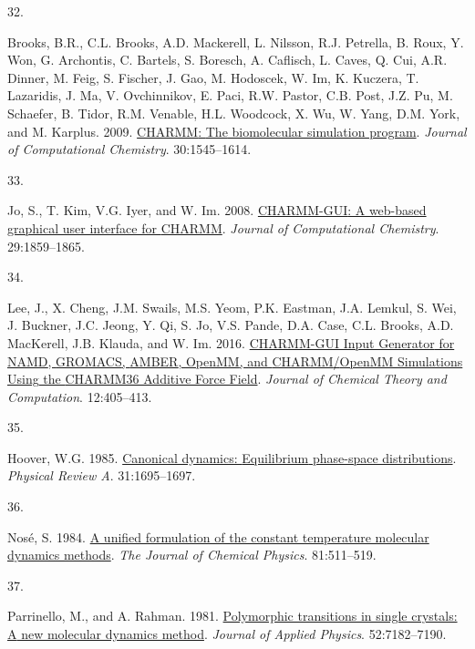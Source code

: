 \documentclass[
  twocolumn]{biophys-new-mod}
\newlength{\cslhangindent}
\newlength{\csllabelwidth}
\newlength{\cslentryspacingunit} %
\newenvironment{CSLReferences}[2] %
 {%
  \setlength{\parindent}{0pt}
  \ifodd #1
  \let\oldpar\par
  \def\par{\hangindent=\cslhangindent\oldpar}
  \fi
  \setlength{\parskip}{#2\cslentryspacingunit}
 }%
 {}
\newcommand{\CSLLeftMargin}[1]{\parbox[t]{\csllabelwidth}{#1}}
\newcommand{\CSLRightInline}[1]{\parbox[t]{\linewidth - \csllabelwidth}{#1}\break}
\begin{document}
\begin{CSLReferences}{0}{0}
\leavevmode{}%
\CSLLeftMargin{32. }%
\CSLRightInline{Brooks, B.R., C.L. Brooks, A.D. Mackerell, L. Nilsson,
R.J. Petrella, B. Roux, Y. Won, G. Archontis, C. Bartels, S. Boresch, A.
Caflisch, L. Caves, Q. Cui, A.R. Dinner, M. Feig, S. Fischer, J. Gao, M.
Hodoscek, W. Im, K. Kuczera, T. Lazaridis, J. Ma, V. Ovchinnikov, E.
Paci, R.W. Pastor, C.B. Post, J.Z. Pu, M. Schaefer, B. Tidor, R.M.
Venable, H.L. Woodcock, X. Wu, W. Yang, D.M. York, and M. Karplus. 2009.
\href{https://doi.org/10.1002/jcc.21287}{{CHARMM}: {The} biomolecular
simulation program}. \emph{Journal of Computational Chemistry}.
30:1545--1614.}

\leavevmode{}%
\CSLLeftMargin{33. }%
\CSLRightInline{Jo, S., T. Kim, V.G. Iyer, and W. Im. 2008.
\href{https://doi.org/10.1002/jcc.20945}{{CHARMM-GUI}: A web-based
graphical user interface for {CHARMM}}. \emph{Journal of Computational
Chemistry}. 29:1859--1865.}

\leavevmode{}%
\CSLLeftMargin{34. }%
\CSLRightInline{Lee, J., X. Cheng, J.M. Swails, M.S. Yeom, P.K. Eastman,
J.A. Lemkul, S. Wei, J. Buckner, J.C. Jeong, Y. Qi, S. Jo, V.S. Pande,
D.A. Case, C.L. Brooks, A.D. MacKerell, J.B. Klauda, and W. Im. 2016.
\href{https://doi.org/10.1021/acs.jctc.5b00935}{{CHARMM-GUI Input
Generator} for {NAMD}, {GROMACS}, {AMBER}, {OpenMM}, and
{CHARMM}/{OpenMM Simulations Using} the {CHARMM36 Additive Force
Field}}. \emph{Journal of Chemical Theory and Computation}.
12:405--413.}

\leavevmode{}%
\CSLLeftMargin{35. }%
\CSLRightInline{Hoover, W.G. 1985.
\href{https://doi.org/10.1103/PhysRevA.31.1695}{Canonical dynamics:
{Equilibrium} phase-space distributions}. \emph{Physical Review A}.
31:1695--1697.}

\leavevmode{}%
\CSLLeftMargin{36. }%
\CSLRightInline{Nosé, S. 1984. \href{https://doi.org/10.1063/1.447334}{A
unified formulation of the constant temperature molecular dynamics
methods}. \emph{The Journal of Chemical Physics}. 81:511--519.}

\leavevmode{}%
\CSLLeftMargin{37. }%
\CSLRightInline{Parrinello, M., and A. Rahman. 1981.
\href{https://doi.org/10.1063/1.328693}{Polymorphic transitions in
single crystals: {A} new molecular dynamics method}. \emph{Journal of
Applied Physics}. 52:7182--7190.}


\end{CSLReferences}
\end{document}
